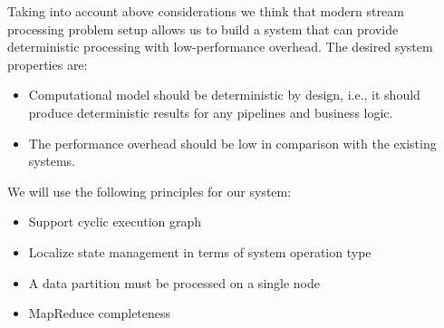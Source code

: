 Taking into account above considerations we think that 
modern stream processing problem setup allows us to build a system that can provide deterministic processing with low-performance overhead. The desired system properties are:
\begin{itemize}
    \item Computational model should be deterministic by design, i.e., it should produce deterministic results for any pipelines and business logic.
    \item The performance overhead should be low in comparison with the existing systems.
\end{itemize}
We will use the following principles for our system:
\begin{itemize}
    \item Support cyclic execution graph
    \item Localize state management in terms of system operation type
    \item A data partition must be processed on a single node
    \item MapReduce completeness
\end{itemize}
